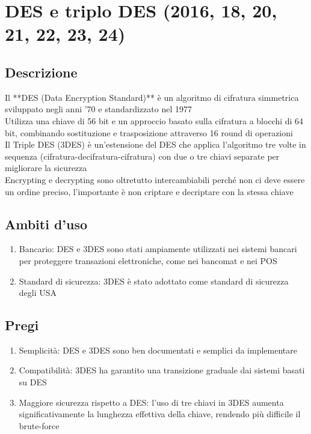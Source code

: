 \documentclass[10pt,oneside,a4paper]{article}
\begin{document}
\section{DES e triplo DES (2016, 18, 20, 21, 22, 23, 24)}
\subsection{Descrizione}
Il **DES (Data Encryption Standard)** è un algoritmo di cifratura simmetrica sviluppato negli anni '70 e standardizzato nel 1977\\
Utilizza una chiave di 56 bit e un approccio basato sulla cifratura a blocchi di 64 bit, combinando sostituzione e trasposizione attraverso 16 round di operazioni\\
Il Triple DES (3DES) è un'estensione del DES che applica l'algoritmo tre volte in sequenza (cifratura-decifratura-cifratura) con due o tre chiavi separate per migliorare la sicurezza\\
Encrypting e decrypting sono oltretutto intercambiabili perché non ci deve essere un ordine preciso, l'importante è non criptare e decriptare con la stessa chiave
\subsection{Ambiti d'uso}
\begin{enumerate}
\item Bancario: DES e 3DES sono stati ampiamente utilizzati nei sistemi bancari per proteggere transazioni elettroniche, come nei bancomat e nei POS
\item Standard di sicurezza: 3DES è stato adottato come standard di sicurezza degli USA
\end{enumerate}
\subsection{Pregi}
\begin{enumerate}
\item Semplicità: DES e 3DES sono ben documentati e semplici da implementare
\item Compatibilità: 3DES ha garantito una transizione graduale dai sistemi basati su DES
\item Maggiore sicurezza rispetto a DES: l'uso di tre chiavi in 3DES aumenta significativamente la lunghezza effettiva della chiave, rendendo più difficile il brute-force
\end{enumerate}
\end{document}
